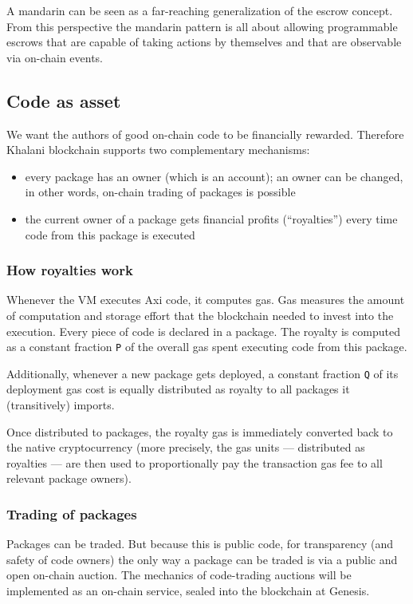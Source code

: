 \documentclass[a4paper]{article}
\newcommand{\code}[1]{{\small \texttt{#1}}}
\begin{document}
A mandarin can be seen as a far-reaching generalization of the escrow concept. From this perspective the mandarin pattern is all about allowing programmable escrows that are capable of taking actions by themselves and that are observable via on-chain events.

\subsection{Code as asset}

We want the authors of good on-chain code to be financially rewarded. Therefore Khalani blockchain supports two complementary mechanisms:

\begin{itemize}
  \item every package has an owner (which is an account); an owner can be changed, in other words, on-chain trading of packages is possible
  \item the current owner of a package gets financial profits (``royalties'') every time code from this package is executed
\end{itemize}

\subsubsection{How royalties work}

Whenever the VM executes Axi code, it computes gas. Gas measures the amount of computation and storage effort that the blockchain needed to invest into the execution. Every piece of code is declared in a package. The royalty is computed as a constant fraction \code{P} of the overall gas spent executing code from this package.

Additionally, whenever a new package gets deployed, a constant fraction \code{Q} of its deployment gas cost is equally distributed as royalty to all packages it (transitively) imports.

Once distributed to packages, the royalty gas is immediately converted back to the native cryptocurrency (more precisely, the gas units --- distributed as royalties --- are then used to proportionally pay the transaction gas fee to all relevant package owners).

\subsubsection{Trading of packages}

Packages can be traded. But because this is public code, for transparency (and safety of code owners) the only way a package can be traded is via a public and open on-chain auction. The mechanics of code-trading auctions will be implemented as an on-chain service, sealed into the blockchain at Genesis.
\end{document}
